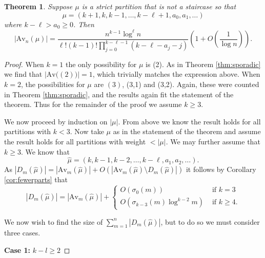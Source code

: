 \documentclass{article}
\theoremstyle{plain}
\newtheorem{theorem}{Theorem}[section]
\theoremstyle{definition}
\newcommand{\Av}{\text{Av}}
\begin{document}
\begin{theorem}\label{thm:not staircase}
Suppose $\mu$ is a strict partition that is not a staircase so that 
$$\mu = (k+1,k, k-1,\ldots, k-\ell+1, a_0,a_1,\ldots) $$
where $k-\ell > a_0\geq 0$.  Then 
$$|\Av_n(\mu)| 
= \frac{n^{k-1}\log^\ell n}{\ell!(k-1)!
\prod_{j=0}^{k-\ell-1}\left(k-\ell -a_j-j\right)}
\left(1+O\left(\frac{1}{\log n}\right)\right).$$
\end{theorem}

\begin{proof}
When $k=1$ the only possibility for $\mu$ is (2).  As in Theorem \ref{thm:sporadic} we find that $\left|\Av\big((2)\big)\right|=1$, which trivially matches the expression above.  When $k=2$, the possibilities for $\mu$ are $(3)$, (3,1) and (3,2).  Again, these were counted in Theorem \ref{thm:sporadic}, and the results again fit the statement of the theorem.  Thus for the remainder of the proof we assume $k\geq 3$.

We now proceed by induction on $|\mu|$.  From above we know the result holds for all partitions with $k< 3$.  Now take $\mu$ as in the statement of the theorem and assume the result holds for all partitions with weight $<|\mu|$.  We may further assume that $k\geq 3$. We know that $$\hat\mu =(k,k-1,k-2,\ldots, k-\ell, a_1, a_{2},\ldots).$$
As $|D_m(\hat\mu)| = |\Av_m(\hat\mu)| + O\left(|\Av_m(\hat\mu)\setminus D_m(\hat\mu)|\right)$ it follows by Corollary \ref{cor:fewerparts} that 
\begin{equation} |D_m(\hat\mu)|  = 
|\Av_m(\hat\mu)| + 
\begin{cases}
O(\sigma_0(m)) &\text{ if } k = 3\\
O(\sigma_{k-3}(m)\log^{k-2}m) &\text{ if } k \geq 4.
\end{cases} \label{eq:muhaterror}
\end{equation}

We now wish to find the size of $\sum_{m=1}^{n} |D_m(\hat\mu)|$, but to do so we must consider three cases.


\medskip\noindent
\textbf{Case 1:} $k-l\geq 2$
\medskip



\end{proof}
\end{document}
